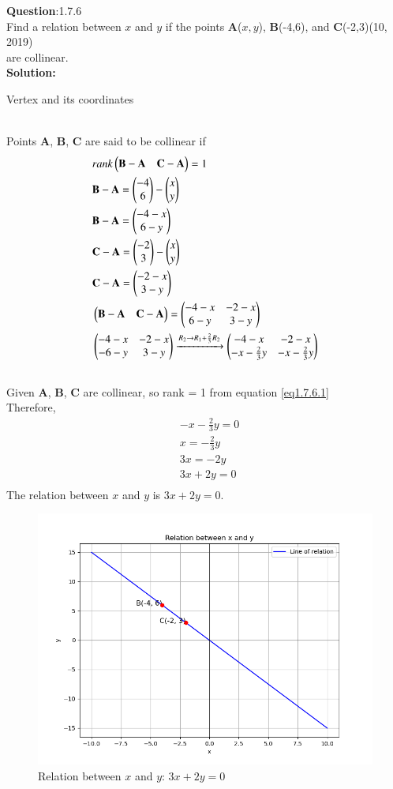 \documentclass[journal]{IEEEtran}
\begin{document}
\textbf{Question}:1.7.6\\
Find a relation between $x$ and $y$ if the points \textbf{A}($x,y$), \textbf{B}(-4,6), and  \textbf{C}(-2,3)\hfill(10, 2019)\\ are collinear.
\\
\textbf{Solution:}
\renewcommand{\tablename}{Table 1.7.6.1}
\begin{table}[h!]
  \centering
  
  \caption{Vertex and its coordinates}
\end{table}
\\
 Points \textbf{A}, \textbf{B}, \textbf{C} are said to be collinear if
 \begin{align}
	 & rank\begin{pmatrix}\mathbf{B} - \mathbf{A} & \mathbf{C} - \mathbf{A}\end{pmatrix} = 1 \label{eq1.7.6.1} \\ &
	 \mathbf{B} - \mathbf{A} = \begin{pmatrix}-4 \\ 6\end{pmatrix} - \begin{pmatrix}x \\ y\end{pmatrix} \\ &
	 \mathbf{B} - \mathbf{A} = \begin{pmatrix}-4 - x \\ 6 - y\end{pmatrix} \\ &
	 \mathbf{C} - \mathbf{A} = \begin{pmatrix}-2 \\ 3\end{pmatrix} - \begin{pmatrix}x \\ y\end{pmatrix} \\ &
	 \mathbf{C} - \mathbf{A} = \begin{pmatrix}-2 - x \\ 3 - y\end{pmatrix} \\ &
	 \begin{pmatrix}\mathbf{B} - \mathbf{A} & \mathbf{C} - \mathbf{A}\end{pmatrix} = \begin{pmatrix}-4 - x & -2 - x \\ 6 - y & 3 - y\end{pmatrix} \\ &
	 \begin{pmatrix}-4 - x & -2 - x \\ -6 - y & 3 - y\end{pmatrix} \xrightarrow[]{R_2 \rightarrow R_1+\frac{2}{3}R_2} \begin{pmatrix}-4 - x & -2 - x \\ -x - \frac{2}{3}y & -x - \frac{2}{3}y\end{pmatrix} \\ &
     \end{align}
Given \textbf{A}, \textbf{B}, \textbf{C} are collinear, so rank = 1 from equation \ref{eq1.7.6.1} \\
Therefore,
\begin{align}
	& -x - \frac{2}{3}y = 0 \\ &
	x = - \frac{2}{3}y \\ &
	3x = -2y \\ &
	3x + 2y = 0 \\ &
\end{align}
The relation between $x$ and $y$ is $3x + 2y = 0$.
\begin{figure}[h!]
   \centering
   \includegraphics[width=0.7\linewidth]{figs/collinear.png}
   \caption{Relation between $x$ and $y$: $3x + 2y = 0$}
   \end{figure}
   
\end{document}
